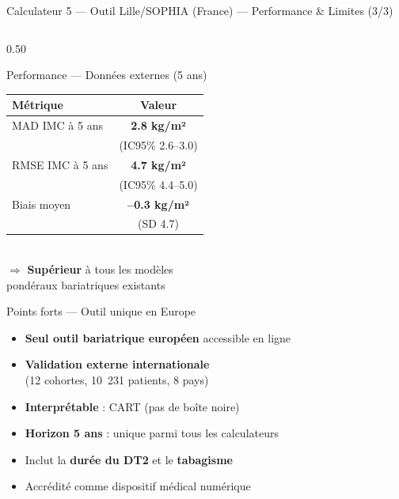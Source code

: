 \documentclass[aspectratio=169]{beamer}
\newcommand{\tightlist}{%
  \setlength{\itemsep}{1pt}\setlength{\parskip}{0pt}%
  \setlength{\parsep}{0pt}\setlength{\topsep}{2pt}}
\begin{document}
\begin{frame}{Calculateur 5 --- Outil Lille/SOPHIA (France) --- Performance \& Limites (3/3)}
  \begin{columns}[T]
    \begin{column}{0.50\textwidth}
      \begin{block}{Performance --- Données externes (5 ans)}
        \footnotesize
        \begin{tabular}{lc}
          \toprule
          \textbf{Métrique} & \textbf{Valeur} \\
          \midrule
          MAD IMC à 5 ans
            & \textcolor{vertdoux}{\textbf{2.8 kg/m²}}\\
            & (IC95\% 2.6--3.0) \\[3pt]
          RMSE IMC à 5 ans
            & \textcolor{orangemod}{\textbf{4.7 kg/m²}}\\
            & (IC95\% 4.4--5.0) \\[3pt]
          Biais moyen
            & \textcolor{vertdoux}{\textbf{--0.3 kg/m²}}\\
            & (SD 4.7) \\
          \bottomrule
        \end{tabular}
        \vspace{6pt}\\
        $\Rightarrow$ \textcolor{vertdoux}{\textbf{Supérieur}} à tous les modèles\\
        pondéraux bariatriques existants
      \end{block}
      \vspace{0.3em}
      \begin{exampleblock}{Points forts --- Outil unique en Europe}
        \footnotesize\tightlist
        \begin{itemize}\tightlist
          \item \textbf{Seul outil bariatrique européen} accessible en ligne
          \item \textbf{Validation externe internationale}\\
                (12 cohortes, 10~231 patients, 8 pays)
          \item \textbf{Interprétable} : CART (pas de boîte noire)
          \item \textbf{Horizon 5 ans} : unique parmi tous les calculateurs
          \item Inclut la \textbf{durée du DT2} et le \textbf{tabagisme}
          \item Accrédité comme dispositif médical numérique

\end{itemize}
\end{exampleblock}
\end{column}
\end{columns}
\end{frame}
\end{document}
